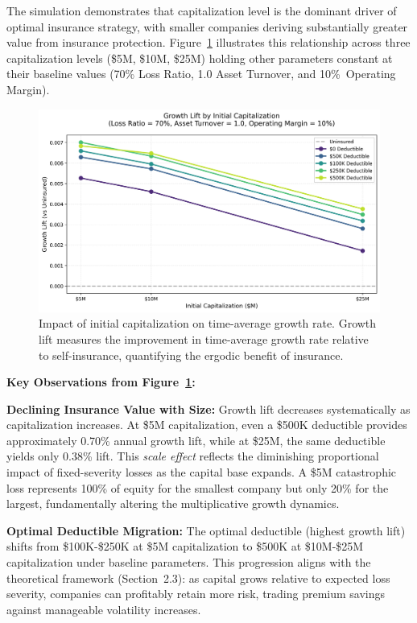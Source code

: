 \documentclass[11pt,letterpaper]{article}
\begin{document}
The simulation demonstrates that capitalization level is the dominant driver of optimal insurance strategy, with smaller companies deriving substantially greater value from insurance protection. Figure~\ref{fig:growth_lift_by_cap} illustrates this relationship across three capitalization levels (\$5M, \$10M, \$25M) holding other parameters constant at their baseline values (70\% Loss Ratio, 1.0 Asset Turnover, and 10\%~Operating Margin).

\begin{figure}[htbp]
    \centering
    \includegraphics[width=1.0\textwidth]{images/growth_lift_by_capitalization.png}
    \caption{Impact of initial capitalization on time-average growth rate. Growth lift measures the improvement in time-average growth rate relative to self-insurance, quantifying the ergodic benefit of insurance.}
    \label{fig:growth_lift_by_cap}
\end{figure}

\textbf{Key Observations from Figure~\ref{fig:growth_lift_by_cap}:}

\textbf{Declining Insurance Value with Size:} Growth lift decreases systematically as capitalization increases. At \$5M capitalization, even a \$500K deductible provides approximately 0.70\% annual growth lift, while at \$25M, the same deductible yields only 0.38\% lift. This \emph{scale effect} reflects the diminishing proportional impact of fixed-severity losses as the capital base expands. A \$5M catastrophic loss represents 100\% of equity for the smallest company but only 20\% for the largest, fundamentally altering the multiplicative growth dynamics.

\vspace{\baselineskip}

\textbf{Optimal Deductible Migration:} The optimal deductible (highest growth lift) shifts from \$100K-\$250K at \$5M capitalization to \$500K at \$10M-\$25M capitalization under baseline parameters. This progression aligns with the theoretical framework (Section~2.3): as capital grows relative to expected loss severity, companies can profitably retain more risk, trading premium savings against manageable volatility increases.
\end{document}
